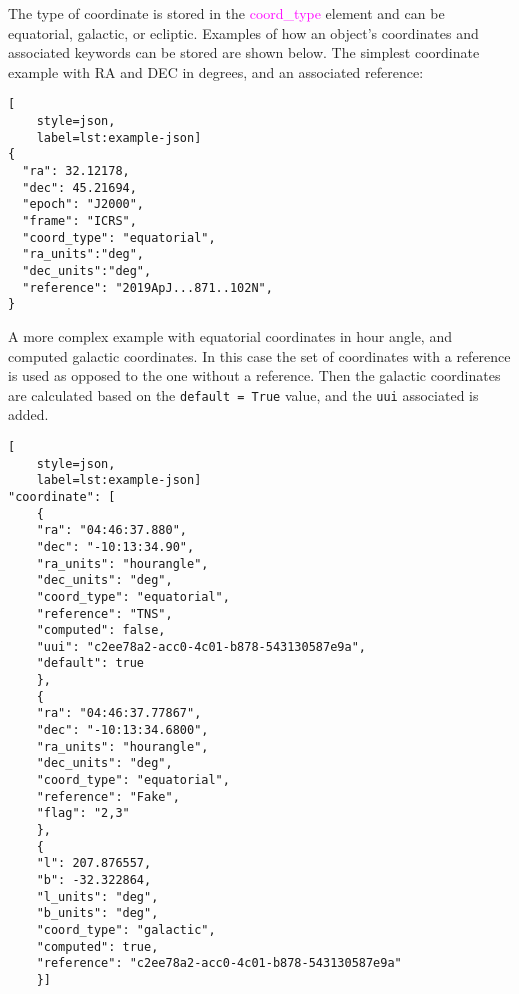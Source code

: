 \documentclass[tighten]{aastex631}
\newcommand{\keyword}[1]{\textcolor{magenta}{#1}}
\begin{document}
The type of coordinate is stored in the \keyword{coord\_type} element and can be equatorial, galactic, or ecliptic. Examples of how an object's coordinates and associated keywords can be stored are shown below. The simplest coordinate example with RA and DEC in degrees, and an associated reference:
\begin{lstlisting}[
    style=json,
    label=lst:example-json]
{
  "ra": 32.12178,
  "dec": 45.21694,
  "epoch": "J2000",
  "frame": "ICRS",
  "coord_type": "equatorial",
  "ra_units":"deg",
  "dec_units":"deg",
  "reference": "2019ApJ...871..102N",
}
\end{lstlisting}

\noindent
A more complex example with equatorial coordinates in hour angle, and computed galactic coordinates. In this case the set of coordinates with a reference is used as opposed to the one without a reference. Then the galactic coordinates are calculated based on the {\tt default = True} value, and the {\tt uui} associated is added.
\begin{lstlisting}[
    style=json,
    label=lst:example-json]
"coordinate": [
    {
    "ra": "04:46:37.880",
    "dec": "-10:13:34.90",
    "ra_units": "hourangle",
    "dec_units": "deg",
    "coord_type": "equatorial",
    "reference": "TNS",
    "computed": false,
    "uui": "c2ee78a2-acc0-4c01-b878-543130587e9a",
    "default": true
    },
    {
    "ra": "04:46:37.77867",
    "dec": "-10:13:34.6800",
    "ra_units": "hourangle",
    "dec_units": "deg",
    "coord_type": "equatorial",
    "reference": "Fake",
    "flag": "2,3"
    },
    {
    "l": 207.876557,
    "b": -32.322864,
    "l_units": "deg",
    "b_units": "deg",
    "coord_type": "galactic",
    "computed": true,
    "reference": "c2ee78a2-acc0-4c01-b878-543130587e9a"
    }]
\end{lstlisting}
\end{document}
